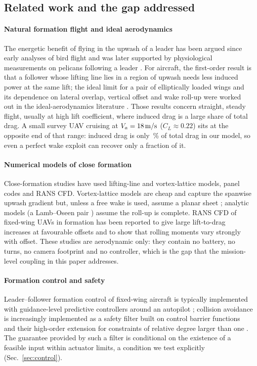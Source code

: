 \subsection{Related work and the gap addressed}\label{sec:related}
\paragraph{Natural formation flight and ideal aerodynamics} The energetic benefit of flying in the upwash of a leader has been argued since early analyses of bird flight \cite{lissaman1970,hummel1983} and was later supported by physiological measurements on pelicans following a leader \cite{weimerskirch2001}. For aircraft, the first-order result is that a follower whose lifting line lies in a region of upwash needs less induced power at the same lift; the ideal limit for a pair of elliptically loaded wings and its dependence on lateral overlap, vertical offset and wake roll-up were worked out in the ideal-aerodynamics literature \cite{king2005}. Those results concern straight, steady flight, usually at high lift coefficient, where induced drag is a large share of total drag. A small survey UAV cruising at $V_a=\SI{18}{m/s}$ ($C_L\approx0.22$) sits at the opposite end of that range: induced drag is only \ncdiShare\,\% of total drag in our model, so even a perfect wake exploit can recover only a fraction of it.

\paragraph{Numerical models of close formation} Close-formation studies have used lifting-line and vortex-lattice models, panel codes and RANS CFD. Vortex-lattice models are cheap and capture the spanwise upwash gradient but, unless a free wake is used, assume a planar sheet \cite{katz2001,weissinger1947}; analytic models (a Lamb--Oseen pair \cite{lamb1932}) assume the roll-up is complete. RANS CFD of fixed-wing UAVs in formation has been reported to give large lift-to-drag increases at favourable offsets \cite{oendo2025} and to show that rolling moments vary strongly with offset. These studies are aerodynamic only: they contain no battery, no turns, no camera footprint and no controller, which is the gap that the mission-level coupling in this paper addresses.

\paragraph{Formation control and safety} Leader--follower formation control of fixed-wing aircraft is typically implemented with guidance-level predictive controllers around an autopilot \cite{beard2012}; collision avoidance is increasingly implemented as a safety filter built on control barrier functions \cite{ames2017} and their high-order extension for constraints of relative degree larger than one \cite{xiao2022}. The guarantee provided by such a filter is conditional on the existence of a feasible input within actuator limits, a condition we test explicitly (Sec.~\ref{sec:control}).

